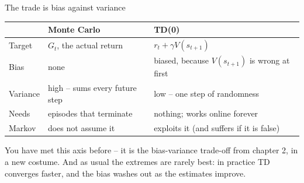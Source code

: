 \documentclass[aspectratio=169]{beamer}
\begin{document}
\begin{frame}{The trade is bias against variance}
  \begin{center}
  \small
  \begin{tabular}{l l l}
    \toprule
     & \textbf{Monte Carlo} & \textbf{TD(0)} \\
    \midrule
    Target & $G_t$, the actual return & $r_t + \gamma V(s_{t+1})$ \\[3pt]
    Bias & none & biased, because $V(s_{t+1})$ is wrong at first \\[3pt]
    Variance & high -- sums every future step & low -- one step of randomness \\[3pt]
    Needs & episodes that terminate & nothing; works online forever \\[3pt]
    Markov & does not assume it & exploits it (and suffers if it is false) \\
    \bottomrule
  \end{tabular}
  \end{center}

  \vskip 10pt
  \begin{tcolorbox}[colback=armblue!8, colframe=armblue, boxrule=0.6pt, arc=2pt]
    \small
    You have met this axis before -- it is the bias-variance trade-off from chapter 2, in a new
    costume. And as usual the extremes are rarely best: in practice TD converges faster, and the
    bias washes out as the estimates improve.
  \end{tcolorbox}
\end{frame}
\end{document}
